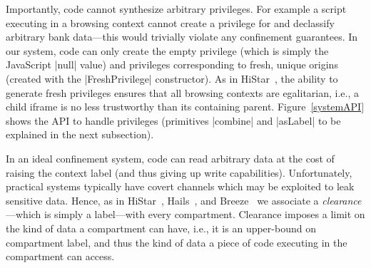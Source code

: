 Importantly, code cannot synthesize arbitrary privileges.
%
For example a script executing in a  browsing
context cannot create a privilege for  and declassify
arbitrary bank data---this would trivially violate any confinement
guarantees.
%
In our system, code can only create the empty privilege (which is
simply the JavaScript \js|null| value) and privileges corresponding
to fresh, unique origins (created with the \js|FreshPrivilege|
constructor).
%
As in HiStar~\cite{Zeldovich:2006}, the ability to generate fresh privileges
ensures that all browsing contexts are egalitarian, i.e., a child iframe is no
less trustworthy than its containing parent.  Figure~\ref{systemAPI} shows the
API to handle privileges (primitives \js|combine| and \js|asLabel| to be 
explained in the next subsection). 


In an ideal confinement system, code can read arbitrary data at the
cost of raising the context label (and thus giving up write
capabilities).
%
Unfortunately, practical systems typically have covert channels which
may be exploited to leak sensitive data.
%
Hence, as in HiStar~\cite{Zeldovich:2006}, Hails~\cite{giffin:2012:hails}, and
Breeze~\cite{Breeze13} we associate a \emph{clearance}---which is
simply a label---with every compartment.
%
Clearance imposes a limit on the kind of data a compartment can have,
i.e., it is an upper-bound on compartment label, and thus the kind of
data a piece of code executing in the compartment can access.


%

